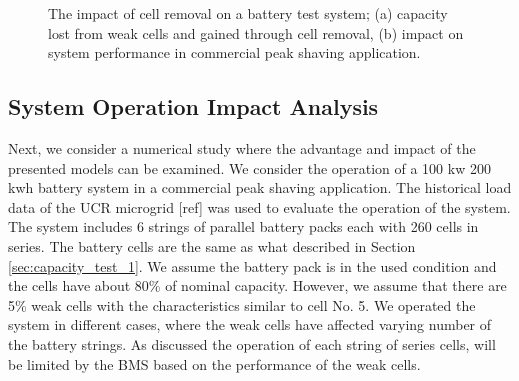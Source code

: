 \documentclass[10pt,twocolumn]{IEEEtran}
\begin{document}
\begin{figure}
\centering
\vspace{-0.2cm}
{} \vspace{-0.1cm}
\caption{The impact of cell removal on a battery test system; (a) capacity lost from weak cells and gained through cell removal, (b) impact on system performance in commercial peak shaving application. }
\vspace{-0.3cm}
\label{fig:operation_impact}
\end{figure} 

\subsection{System Operation Impact Analysis }

Next, we consider a numerical study where the advantage and impact of the presented models can be examined.
We consider the operation of a 100 kw 200 kwh battery system in a commercial peak shaving application.
The historical load data of the UCR microgrid [ref] was used to evaluate the operation of the system.
The system includes 6 strings of parallel battery packs each with 260 cells in series.
The battery cells are the same as what described in Section \ref{sec:capacity_test_1}.
We assume the battery pack is in the used condition and the cells have about 80\% of nominal capacity.
However,  we assume that there are  5\%   weak cells with the characteristics similar to cell No. 5.
We operated the system in different cases, where the weak cells have affected varying number of the battery strings.
As discussed the operation of each string of series cells, will be limited by the BMS based on the performance of the weak cells.
\end{document}
